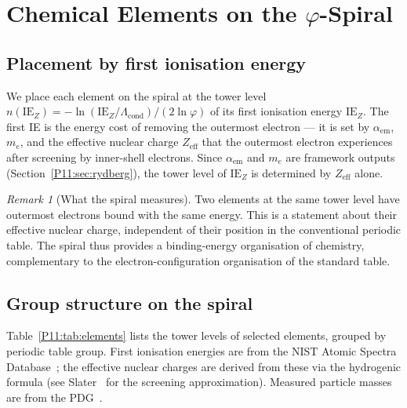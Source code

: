 \documentclass[11pt,a4paper]{article}
\theoremstyle{definition}
\theoremstyle{remark}
\newtheorem{remark}[theorem]{Remark}
\newcommand{\vp}{\varphi}
\newcommand{\Lcond}{\Lambda_{\mathrm{cond}}}
\newcommand{\aem}{\alpha_{\mathrm{em}}}
\newcommand{\IE}{\mathrm{IE}}
\begin{document}
\section{Chemical Elements on the $\vp$-Spiral}
\label{P11:sec:elements}

\subsection{Placement by first ionisation energy}

We place each element on the spiral at the tower level
$n(\IE_Z) = -\ln(\IE_Z/\Lcond)/(2\ln\vp)$ of its
first ionisation energy $\IE_Z$.
The first IE is the energy cost of removing the outermost
electron — it is set by $\aem$, $m_e$, and the effective
nuclear charge $Z_\mathrm{eff}$ that the outermost electron
experiences after screening by inner-shell electrons.
Since $\aem$ and $m_e$ are framework outputs
(Section~\ref{P11:sec:rydberg}), the tower level of $\IE_Z$ is
determined by $Z_\mathrm{eff}$ alone.

\begin{remark}[What the spiral measures]
\label{P11:rem:spiral_measures}
Two elements at the same tower level have outermost electrons
bound with the same energy.  This is a statement about their
effective nuclear charge, independent of their position in
the conventional periodic table.  The spiral thus provides a
binding-energy organisation of chemistry, complementary to
the electron-configuration organisation of the standard table.
\end{remark}

\subsection{Group structure on the spiral}
\label{P11:sec:group_structure}

Table~\ref{P11:tab:elements} lists the tower levels of selected elements,
grouped by periodic table group.
First ionisation energies are from the NIST Atomic Spectra
Database~\cite{NIST_ASD}; the effective nuclear charges
are derived from these via the hydrogenic formula
(see Slater~\cite{Slater1930} for the screening approximation).
Measured particle masses are from the PDG~\cite{PDG2024}.
\end{document}
